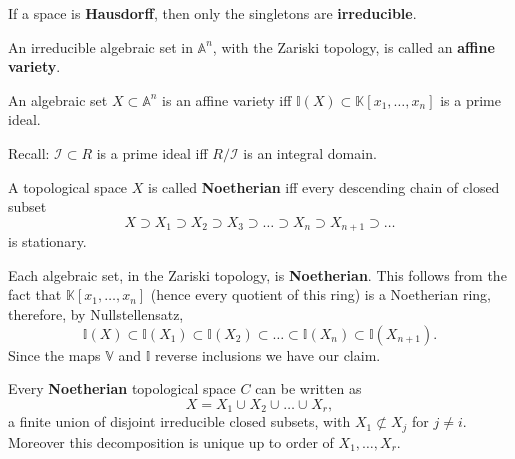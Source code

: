 \begin{rem}
	If a space is \textbf{Hausdorff}, then only the singletons are \textbf{irreducible}.
\end{rem}

\begin{defn}
	An irreducible algebraic set in $\mathbb{A}^n$, with the Zariski topology, is called an \textbf{affine variety}.
\end{defn}

\begin{lem}
	An algebraic set $X \subset \mathbb{A}^n$ is an affine variety iff $\mathbb{I}(X) \subset \mathbb{K}\left[x_1, \ldots, x_n \right]$ is a prime ideal.
\end{lem} 
\begin{rem}
	Recall: $\mathcal{I} \subset R$ is a prime ideal iff $R/\mathcal{I}$ is an integral domain.
\end{rem}

\begin{defn}
	A topological space $X$ is called \textbf{Noetherian} iff every descending chain of closed subset
	\begin{equation}
	X \supset X_1 \supset X_2 \supset X_3 \supset \ldots \supset X_n \supset X_{n+1} \supset \ldots
	\end{equation} 
	is stationary.
\end{defn}

\begin{rem}
	Each algebraic set, in the Zariski topology, is \textbf{Noetherian}.
	This follows from the fact that $\mathbb{K}\left[x_1, \ldots, x_n \right]$ (hence every quotient of this ring) is a Noetherian ring, therefore, by Nullstellensatz,
	\begin{equation}
		\mathbb{I}(X) \subset \mathbb{I}(X_1) \subset \mathbb{I}(X_2) \subset \ldots \subset \mathbb{I}(X_n) \subset \mathbb{I}(X_{n+1})
	.\end{equation} 
	Since the maps $\mathbb{V}$ and $\mathbb{I}$ reverse inclusions we have our claim. 
\end{rem}

\begin{prop}
	Every \textbf{Noetherian} topological space $C$ can be written as
	\begin{equation}
	X = X_1 \cup_{} X_2 \cup_{} \ldots \cup_{} X_r
	,\end{equation} 
	a finite union of disjoint irreducible closed subsets, with $X_1 \not\subset X_j$ for $j \neq i$.
	Moreover this decomposition is unique up to order of $X_1, \ldots, X_r$.
\end{prop} 

